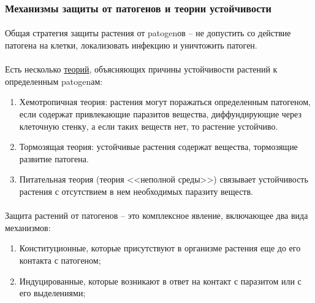 \subsubsection*{Механизмы защиты от патогенов и теории устойчивости}

\paragraph*{}Общая стратегия защиты растения от \gls{patogen}ов -- не допустить со действие патогена на клетки, локализовать инфекцию и уничтожить патоген.

\paragraph*{}Есть несколько \hyperlink{resistence_theories_quest}{теорий}, объясняющих причины устойчивости растений к определенным \gls{patogen}ам:

\begin{enumerate}

	\item Хемотропичная теория: растения могут поражаться определенным патогеном, если содержат привлекающие паразитов вещества, диффундирующие через клеточную стенку, а если таких веществ нет, то растение устойчиво. 
	\item Тормозящая теория: устойчивые растения содержат вещества, тормозящие развитие патогена. 
	\item Питательная теория (теория <<неполной среды>>) связывает устойчивость растения с отсутствием в нем необходимых паразиту веществ.

\end{enumerate}


\paragraph*{}Защита растений от патогенов -- это комплексное явление, включающее два вида механизмов: 

\begin{enumerate}
	\item Конституционные, которые присутствуют в организме растения еще до его контакта с патогеном;
	\item Индуцированные, которые возникают в ответ на контакт с паразитом или с его выделениями;
\end{enumerate}

